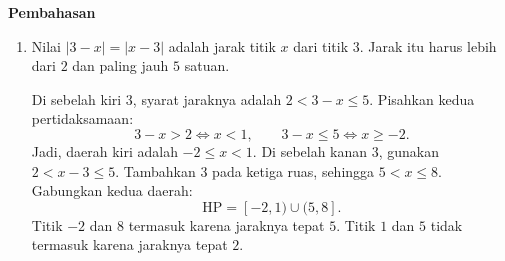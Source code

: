 \documentclass[10pt,letterpaper]{article}
\begin{document}
\newpage
\begingroup
\fontsize{10.95}{13.5}\selectfont
\setlength{\parskip}{3pt}
\textbf{\large Pembahasan}\par\medskip
\begin{enumerate}

  \item Nilai $|3-x|=|x-3|$ adalah jarak titik $x$ dari titik $3$.
        Jarak itu harus lebih dari $2$ dan paling jauh $5$ satuan.

        Di sebelah kiri $3$, syarat jaraknya adalah $2<3-x\le5$.
        Pisahkan kedua pertidaksamaan:
        \[
          3-x>2\iff x<1,\qquad
          3-x\le5\iff x\ge-2.
        \]
        Jadi, daerah kiri adalah $-2\le x<1$.
        Di sebelah kanan $3$, gunakan $2<x-3\le5$.
        Tambahkan $3$ pada ketiga ruas, sehingga $5<x\le8$.
        Gabungkan kedua daerah:
        \[
          \boxed{\mathrm{HP}=[-2,1)\cup(5,8]}.
        \]
        Titik $-2$ dan $8$ termasuk karena jaraknya tepat $5$.
        Titik $1$ dan $5$ tidak termasuk karena jaraknya tepat $2$.
        \begin{center}
        \end{center}


\end{enumerate}
\end{document}
